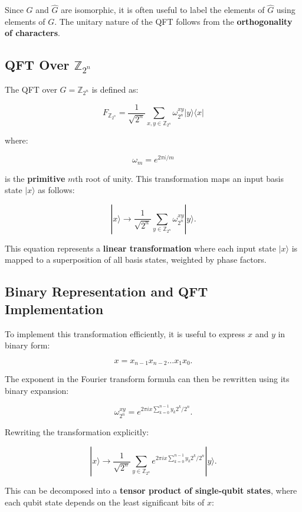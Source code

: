 \documentclass[11pt]{article}
\theoremstyle{definition}
\begin{document}
Since \( G \) and \( \hat{G} \) are isomorphic, it is often useful to label the elements of \( \hat{G} \) using elements of \( G \). The unitary nature of the QFT follows from the \textbf{orthogonality of characters}.



\subsection{QFT Over \( \mathbb{Z}_{2^n} \)}

The QFT over \( G = \mathbb{Z}_{2^n} \) is defined as:

\[
F_{\mathbb{Z}_{2^n}} = \frac{1}{\sqrt{2^n}} \sum_{x,y \in \mathbb{Z}_{2^n}} \omega_{2^n}^{xy} | y \rangle \langle x |
\]

where:

\[
\omega_m = e^{2\pi i / m}
\]

is the \textbf{primitive} \( m \)th root of unity. This transformation maps an input basis state \( |x\rangle \) as follows:

\[
| x \rangle \to \frac{1}{\sqrt{2^n}} \sum_{y \in \mathbb{Z}_{2^n}} \omega_{2^n}^{xy} | y \rangle.
\]

This equation represents a \textbf{linear transformation} where each input state \( |x\rangle \) is mapped to a superposition of all basis states, weighted by phase factors.

\subsection{Binary Representation and QFT Implementation}

To implement this transformation efficiently, it is useful to express \( x \) and \( y \) in binary form:

\[
x = x_{n-1} x_{n-2} \dots x_1 x_0.
\]

The exponent in the Fourier transform formula can then be rewritten using its binary expansion:

\[
\omega_{2^n}^{xy} = e^{2\pi i x \sum_{k=0}^{n-1} y_k 2^k / 2^n}.
\]

Rewriting the transformation explicitly:

\[
| x \rangle \to \frac{1}{\sqrt{2^n}} \sum_{y \in \mathbb{Z}_{2^n}} e^{2\pi i x \sum_{k=0}^{n-1} y_k 2^k / 2^n} | y \rangle.
\]

This can be decomposed into a \textbf{tensor product of single-qubit states}, where each qubit state depends on the least significant bits of \( x \):
\end{document}
